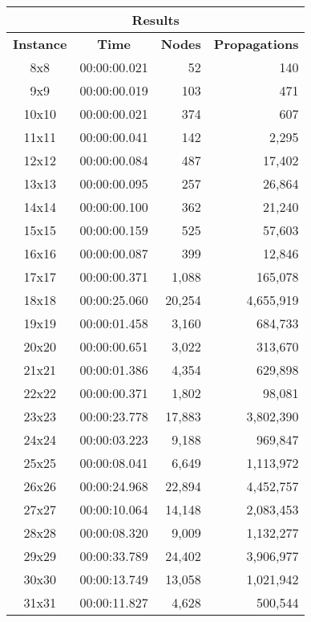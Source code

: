 
\begin{center}
    \begin{tabular}{|c|c|r|r|}
        \hline
        \multicolumn{4}{|c|}{\textbf{Results}} \\
        \hline
        \textbf{Instance} & \textbf{Time} & \textbf{Nodes} & \textbf{Propagations} \\
        
        \hline
		8x8 & 00:00:00.021 & 52 & 140 \\ \hline
		9x9 & 00:00:00.019 & 103 & 471 \\ \hline
		10x10 & 00:00:00.021 & 374 & 607 \\ \hline
		11x11 & 00:00:00.041 & 142 & 2,295 \\ \hline
		12x12 & 00:00:00.084 & 487 & 17,402 \\ \hline
		13x13 & 00:00:00.095 & 257 & 26,864 \\ \hline
		14x14 & 00:00:00.100 & 362 & 21,240 \\ \hline
		15x15 & 00:00:00.159 & 525 & 57,603 \\ \hline
		16x16 & 00:00:00.087 & 399 & 12,846 \\ \hline
		17x17 & 00:00:00.371 & 1,088 & 165,078 \\ \hline
		18x18 & 00:00:25.060 & 20,254 & 4,655,919 \\ \hline
		19x19 & 00:00:01.458 & 3,160 & 684,733 \\ \hline
		20x20 & 00:00:00.651 & 3,022 & 313,670 \\ \hline
		21x21 & 00:00:01.386 & 4,354 & 629,898 \\ \hline
		22x22 & 00:00:00.371 & 1,802 & 98,081 \\ \hline
		23x23 & 00:00:23.778 & 17,883 & 3,802,390 \\ \hline
		24x24 & 00:00:03.223 & 9,188 & 969,847 \\ \hline
		25x25 & 00:00:08.041 & 6,649 & 1,113,972 \\ \hline
		26x26 & 00:00:24.968 & 22,894 & 4,452,757 \\ \hline
		27x27 & 00:00:10.064 & 14,148 & 2,083,453 \\ \hline
		28x28 & 00:00:08.320 & 9,009 & 1,132,277 \\ \hline
		29x29 & 00:00:33.789 & 24,402 & 3,906,977 \\ \hline
		30x30 & 00:00:13.749 & 13,058 & 1,021,942 \\ \hline
		31x31 & 00:00:11.827 & 4,628 & 500,544 \\ \hline

\end{tabular}
\end{center}
